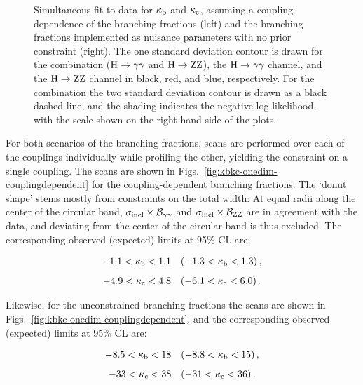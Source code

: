 \begin{figure}[hbtp]
\begin{center}
{        }
    \caption{
        Simultaneous fit to data for $\kappa_{\mathrm{b}}$ and $\kappa_{\mathrm{c}}$, assuming a coupling dependence of the branching fractions (left) and the branching fractions implemented as nuisance parameters with no prior constraint (right).
        The one standard deviation contour is drawn for the combination ($\mathrm{H}\to\mathrm{\gamma}\mathrm{\gamma}$ and $\mathrm{H}\to\mathrm{Z}\mathrm{Z}$), the $\mathrm{H}\to\mathrm{\gamma}\mathrm{\gamma}$ channel, and the $\mathrm{H}\to\mathrm{Z}\mathrm{Z}$ channel in black, red, and blue, respectively.
        For the combination the two standard deviation contour is drawn as a black dashed line, and the shading indicates the negative log-likelihood, with the scale shown on the right hand side of the plots.
        }
    \label{fig:kbkc}
  \end{center}
\end{figure}


For both scenarios of the branching fractions, scans are performed over each of the couplings individually while profiling the other, yielding the constraint on a single coupling.
% 
The scans are shown in Figs.~\ref{fig:kbkc-onedim-couplingdependent} for the coupling-dependent branching fractions.
% 
The `donut shape' stems mostly from constraints on the total width: At equal radii along the center of the circular band, $\sigma_\text{incl} \times \mathcal{B}_{\mathrm{\gamma}\mathrm{\gamma}}$ and $\sigma_\text{incl} \times \mathcal{B}_{\mathrm{Z}\mathrm{Z}}$ are in agreement with the data, and deviating from the center of the circular band is thus excluded.
% 
The corresponding observed (expected) limits at 95\% CL are:
% 
\begin{linenomath*}
\begin{equation}
\label{eq:kappasensitivity}
\begin{array}{c}
-1.1 < \kappa_{\mathrm{b}} < 1.1  \quad(-1.3 < \kappa_{\mathrm{b}} < 1.3 )  \,,
\\[8pt]
-4.9 < \kappa_{\mathrm{c}} < 4.8 \quad(-6.1 < \kappa_{\mathrm{c}} < 6.0 )
\,.
\end{array}
\end{equation}
\end{linenomath*}
% 
Likewise, for the unconstrained branching fractions the scans are shown in Figs.~\ref{fig:kbkc-onedim-couplingdependent}, and the corresponding observed (expected) limits at 95\% CL are:
% 
\begin{linenomath*}
\begin{equation}
\label{eq:kappasensitivity_floatingBRs}
\begin{array}{c}
-8.5 < \kappa_{\mathrm{b}} < 18  \quad(-8.8 < \kappa_{\mathrm{b}} < 15 )  \,,
\\[8pt]
-33 < \kappa_{\mathrm{c}} < 38 \quad(-31 < \kappa_{\mathrm{c}} < 36 )
\,.
\end{array}
\end{equation}
\end{linenomath*}
